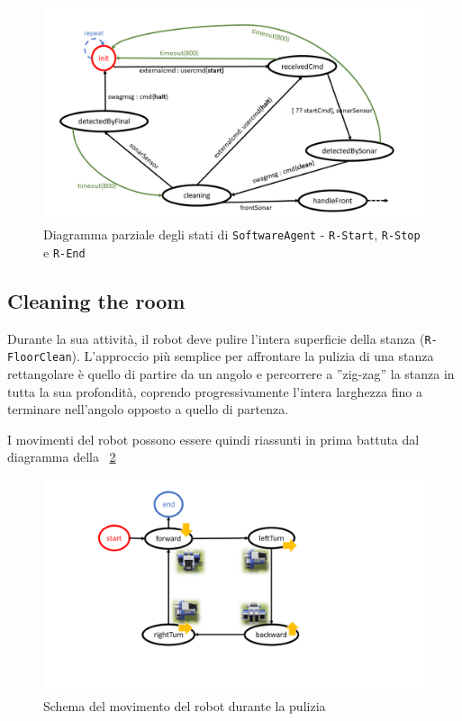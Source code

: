 \documentclass{../llncs}
\newcommand{\code}[1]{{\color{blue}\small{\texttt{#1}}}}
\newcommand{\labelfig}[1]{\label{fig:#1}}
\newcommand{\xf}[1]{\figurename~\ref{fig:#1}}
\begin{document}
\begin{figure}[!htb]
\centering
\includegraphics[scale=0.4]{img/stateDiagramStartStopEnd.png}
\caption{Diagramma parziale degli stati di \texttt{SoftwareAgent} - \code{R-Start}, \code{R-Stop} e \code{R-End}}\labelfig{fsmStartStopEnd}
\end{figure}

\subsection{Cleaning the room}
Durante la sua attività, il robot deve pulire l'intera superficie della stanza (\code{R-FloorClean}). L'approccio più semplice per affrontare la pulizia di una stanza rettangolare è quello di partire da un angolo e percorrere a ''zig-zag'' la stanza in tutta la sua profondità, coprendo progressivamente l'intera larghezza fino a terminare nell'angolo opposto a quello di partenza.

I movimenti del robot possono essere quindi riassunti in prima battuta dal diagramma della \xf{floorCleanDraft}

\begin{figure}[!htb]
\centering
\includegraphics[scale=0.45]{img/stateDiagramCleaningDraft.png}
\caption{Schema del movimento del robot durante la pulizia}\labelfig{floorCleanDraft}
\end{figure}
\end{document}
